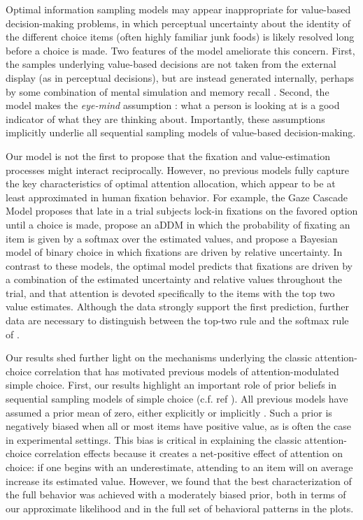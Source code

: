 Optimal information sampling models may appear inappropriate for value-based decision-making problems, in which perceptual uncertainty about the identity of the different choice items (often highly familiar junk foods) is likely resolved long before a choice is made. Two features of the model ameliorate this concern. First, the samples underlying value-based decisions are not taken from the external display (as in perceptual decisions), but are instead generated internally, perhaps by some combination of mental simulation and memory recall \citep{biderman2020what,bakkour2019hippocampus,wang2022mixing}. Second, the model makes the \emph{eye-mind} assumption \citep{just1976eye,orquin2013attention}: what a person is looking at is a good indicator of what they are thinking about. Importantly, these assumptions implicitly underlie all sequential sampling models of value-based decision-making.


Our model is not the first to propose that the fixation and value-estimation processes might interact reciprocally. However, no previous models fully capture the key characteristics of optimal attention allocation, which appear to be at least approximated in human fixation behavior. For example, the Gaze Cascade Model \citep{shimojo2003gaze} proposes that late in a trial subjects lock-in fixations on the favored option until a choice is made, \citep{gluth2020valuebased} propose an aDDM in which the probability of fixating an item is given by a softmax over the estimated values, and \citep{song2019proactive} propose a Bayesian model of binary choice in which fixations are driven by relative uncertainty. In contrast to these models, the optimal model predicts that fixations are driven by a combination of the estimated uncertainty and relative values throughout the trial, and that attention is devoted specifically to the items with the top two value estimates. Although the data strongly support the first prediction, further data are necessary to distinguish between the top-two rule and the softmax rule of \citep{gluth2020valuebased}.


Our results shed further light on the mechanisms underlying the classic attention-choice correlation that has motivated previous models of attention-modulated simple choice. First, our results highlight an important role of prior beliefs in sequential sampling models of simple choice (c.f. ref \citealp{jang2021optimal}). All previous models have assumed a prior mean of zero, either explicitly \citep{song2019proactive,jang2021optimal} or implicitly \citep{krajbich2010visual,krajbich2011multialternative,gluth2020valuebased}. Such a prior is negatively biased when all or most items have positive value, as is often the case in experimental settings. This bias is critical in explaining the classic attention-choice correlation effects because it creates a net-positive effect of attention on choice: if one begins with an underestimate, attending to an item will on average increase its estimated value. However, we found that the best characterization of the full behavior was achieved with a moderately biased prior, both in terms of our approximate likelihood and in the full set of behavioral patterns in the plots.

